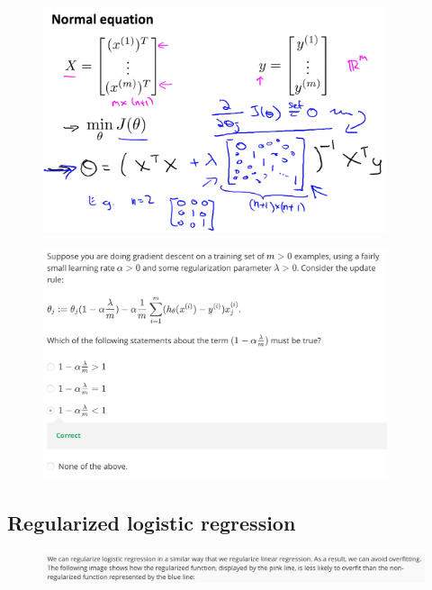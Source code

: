\documentclass[12pt, A4,onecolumn]{article} %
\begin{document}
\begin{figure}[H]
	\centering
	\includegraphics[width=0.9\textwidth]{./Imagenes/regulNormalEq2}
\end{figure}

\begin{figure}[H]
	\centering
	\includegraphics[width=0.9\textwidth]{./Imagenes/testRegulLinear}
\end{figure}
\newpage

\subsection{Regularized logistic regression}
\begin{figure}[H]
	\centering
	\includegraphics[width=1\textwidth]{./Imagenes/regulLogicReg1}
\end{figure}
\end{document}
